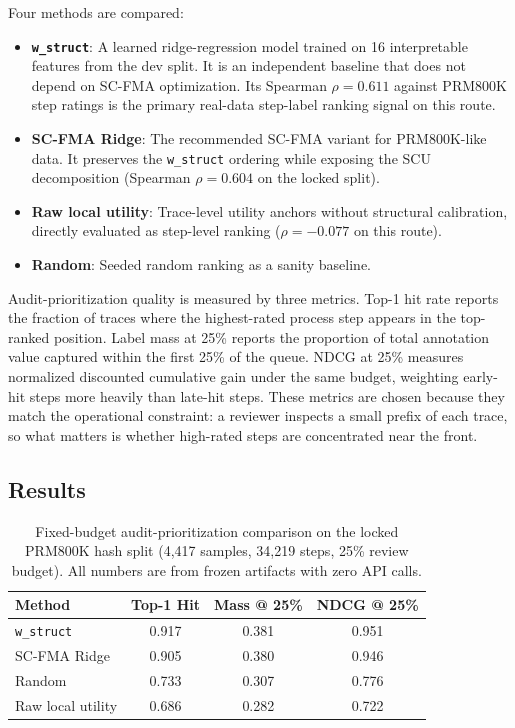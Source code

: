 \documentclass[a4paper,fleqn]{cas-sc}
\begin{document}
Four methods are compared:
\begin{itemize}
  \item \textbf{\texttt{w\_struct}}: A learned ridge-regression model trained on 16 interpretable features from the dev split. It is an independent baseline that does not depend on SC-FMA optimization. Its Spearman $\rho=0.611$ against PRM800K step ratings is the primary real-data step-label ranking signal on this route.
  \item \textbf{SC-FMA Ridge}: The recommended SC-FMA variant for PRM800K-like data. It preserves the \texttt{w\_struct} ordering while exposing the SCU decomposition (Spearman $\rho=0.604$ on the locked split).
  \item \textbf{Raw local utility}: Trace-level utility anchors without structural calibration, directly evaluated as step-level ranking ($\rho=-0.077$ on this route).
  \item \textbf{Random}: Seeded random ranking as a sanity baseline.
\end{itemize}

Audit-prioritization quality is measured by three metrics. Top-1 hit rate reports the fraction of traces where the highest-rated process step appears in the top-ranked position. Label mass at 25\% reports the proportion of total annotation value captured within the first 25\% of the queue. NDCG at 25\% measures normalized discounted cumulative gain under the same budget, weighting early-hit steps more heavily than late-hit steps. These metrics are chosen because they match the operational constraint: a reviewer inspects a small prefix of each trace, so what matters is whether high-rated steps are concentrated near the front.

\subsection{Results}
\label{sec:audit-results}

\begin{table}[ht]
\caption{Fixed-budget audit-prioritization comparison on the locked PRM800K hash split (4,417 samples, 34,219 steps, 25\% review budget). All numbers are from frozen artifacts with zero API calls.}
\label{tab:audit-demo-results}
\centering
\small
\renewcommand{\arraystretch}{1.08}
\begin{tabular}{lccc}
\toprule
\textbf{Method} & \textbf{Top-1 Hit} & \textbf{Mass @ 25\%} & \textbf{NDCG @ 25\%} \\
\midrule
\texttt{w\_struct}       & 0.917 & 0.381 & 0.951 \\
SC-FMA Ridge             & 0.905 & 0.380 & 0.946 \\
Random                   & 0.733 & 0.307 & 0.776 \\
Raw local utility        & 0.686 & 0.282 & 0.722 \\
\bottomrule
\end{tabular}
\end{table}
\end{document}
